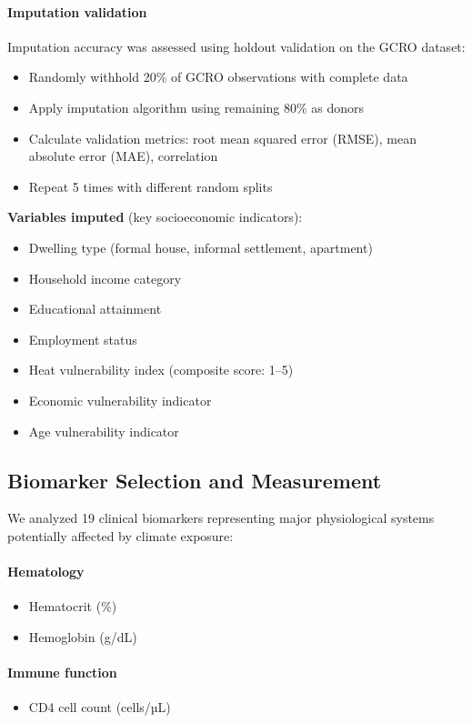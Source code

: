 \paragraph{Imputation validation}
Imputation accuracy was assessed using holdout validation on the GCRO dataset:
\begin{itemize}
    \item Randomly withhold 20\% of GCRO observations with complete data
    \item Apply imputation algorithm using remaining 80\% as donors
    \item Calculate validation metrics: root mean squared error (RMSE), mean absolute error (MAE), correlation
    \item Repeat 5 times with different random splits
\end{itemize}

\textbf{Variables imputed} (key socioeconomic indicators):
\begin{itemize}
    \item Dwelling type (formal house, informal settlement, apartment)
    \item Household income category
    \item Educational attainment
    \item Employment status
    \item Heat vulnerability index (composite score: 1--5)
    \item Economic vulnerability indicator
    \item Age vulnerability indicator
\end{itemize}

\subsection{Biomarker Selection and Measurement}

We analyzed 19 clinical biomarkers representing major physiological systems potentially affected by climate exposure:

\paragraph{Hematology}
\begin{itemize}
    \item Hematocrit (\%)
    \item Hemoglobin (g/dL)
\end{itemize}

\paragraph{Immune function}
\begin{itemize}
    \item CD4 cell count (cells/µL)
\end{itemize}

